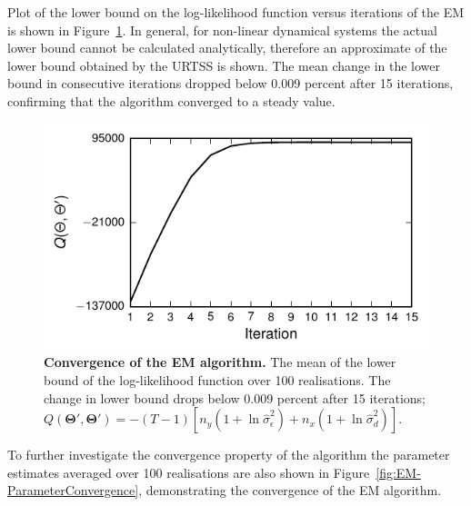 \documentclass[]{article}
\begin{document}
Plot of the lower bound on the log-likelihood function versus iterations of the EM is shown in Figure~\ref{fig:LowerBound}. In general, for non-linear dynamical systems the actual lower bound cannot be calculated analytically, therefore an approximate of the lower bound obtained by the URTSS is shown. The mean change in the lower bound in consecutive iterations dropped below 0.009 percent after 15 iterations, confirming that the algorithm converged to a steady value.
\begin{figure}[!ht]
\centering
\includegraphics{./Figures/Q.pdf}
\caption{{\bf Convergence of the EM algorithm.} The mean of the lower bound of the log-likelihood function over 100 realisations. The change in lower bound drops below 0.009 percent after 15 iterations; \small{$Q(\boldsymbol\Theta',\boldsymbol\Theta')=-(T-1)\left[n_y(1+\ln \hat{\sigma}^2_{\epsilon})+ n_x(1+\ln \hat{\sigma}^2_d)\right]$}.}
\label{fig:LowerBound}
\end{figure}
To further investigate the convergence property of the algorithm the parameter estimates averaged over 100 realisations are also shown in Figure~\ref{fig:EM-ParameterConvergence}, demonstrating the convergence of the EM algorithm.
\end{document}

